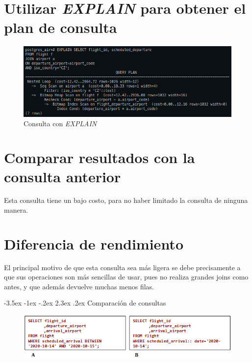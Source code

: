 \documentclass[11pt]{report}
\makeatletter
\renewcommand\chapter{\@startsection{chapter}{0}{\z@}%
    {-3.5ex \@plus -1ex \@minus -.2ex}%
    {2.3ex \@plus.2ex}%
    {\normalfont\Large\bfseries}}
\makeatother
\begin{document}
\section{Utilizar \emph{EXPLAIN} para obtener el plan de consulta}
\begin{figure}[H]
  \centering
  \includegraphics[scale=0.55]{img/consulta_explain_CZ.png}
  \caption{Consulta con \emph{EXPLAIN}}
  \label{fig:consulta con EXPLAIN CZ}
\end{figure}

\section{Comparar resultados con la consulta anterior}
Esta consulta tiene un bajo costo, para no haber limitado la consulta de ninguna manera.

\section{Diferencia de rendimiento}
El principal motivo de que esta consulta sea más ligera se debe precisamente a que sus
operaciones son más sencillas de usar, pues no realiza grandes joins como antes, y que
además devuelve muchas menos filas.

\cleardoublepage

\chapter{Comparación de consultas}
\begin{figure}[H]
  \centering
  \includegraphics[scale=0.65]{img/comparacion_rendimiento.png}
  \label{fig:comparación de rendimiento}
\end{figure}
\end{document}

